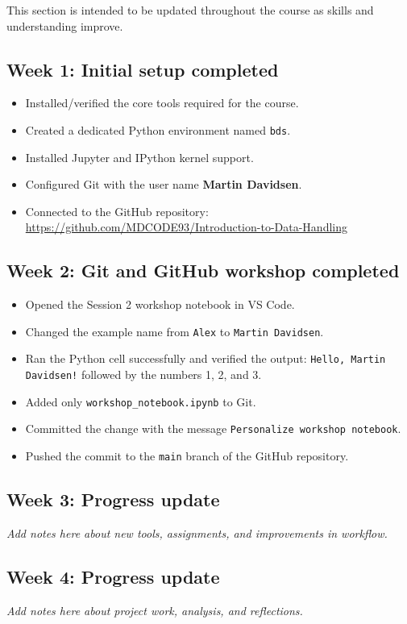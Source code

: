 \documentclass[11pt,a4paper]{article}
\begin{document}
This section is intended to be updated throughout the course as skills and understanding improve.

\subsection{Week 1: Initial setup completed}
\begin{itemize}[leftmargin=1.5em]
    \item Installed/verified the core tools required for the course.
    \item Created a dedicated Python environment named \texttt{bds}.
    \item Installed Jupyter and IPython kernel support.
    \item Configured Git with the user name \textbf{Martin Davidsen}.
    \item Connected to the GitHub repository: \url{https://github.com/MDCODE93/Introduction-to-Data-Handling}
\end{itemize}

\subsection{Week 2: Git and GitHub workshop completed}
\begin{itemize}[leftmargin=1.5em]
    \item Opened the Session 2 workshop notebook in VS Code.
    \item Changed the example name from \texttt{Alex} to \texttt{Martin Davidsen}.
    \item Ran the Python cell successfully and verified the output: \texttt{Hello, Martin Davidsen!} followed by the numbers 1, 2, and 3.
    \item Added only \texttt{workshop\_notebook.ipynb} to Git.
    \item Committed the change with the message \texttt{Personalize workshop notebook}.
    \item Pushed the commit to the \texttt{main} branch of the GitHub repository.
\end{itemize}

\subsection{Week 3: Progress update}
\textit{Add notes here about new tools, assignments, and improvements in workflow.}

\subsection{Week 4: Progress update}
\textit{Add notes here about project work, analysis, and reflections.}
\end{document}
